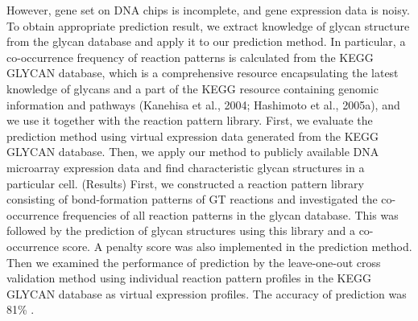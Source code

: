 \documentclass[12pt,a4paper]{article}
\begin{document}
However, gene set on DNA chips is incomplete, and gene expression data is noisy. To obtain appropriate prediction result, we extract knowledge of glycan structure from the glycan database and apply it to our prediction method. In particular, a co-occurrence frequency of reaction patterns is calculated from the KEGG GLYCAN database, which is a comprehensive resource encapsulating the latest knowledge of glycans and a part of the KEGG resource containing genomic information and pathways (Kanehisa et al., 2004; Hashimoto et al., 2005a), and we use it together with the reaction pattern library. First, we evaluate the prediction method using virtual expression data generated from the KEGG GLYCAN database. Then, we apply our method to publicly available DNA microarray expression data and find characteristic glycan structures in a particular cell. (Results) First, we constructed a reaction pattern library consisting of bond-formation patterns of GT reactions and investigated the co-occurrence frequencies of all reaction patterns in the glycan database. This was followed by the prediction of glycan structures using this library and a co-occurrence score. A penalty score was also implemented in the prediction method. Then we examined the performance of prediction by the leave-one-out cross validation method using individual reaction pattern profiles in the KEGG GLYCAN database as virtual expression profiles. The accuracy of prediction was 81\% \citep{doi:10.1093/bioinformatics/bti666}. \\
\end{document}
